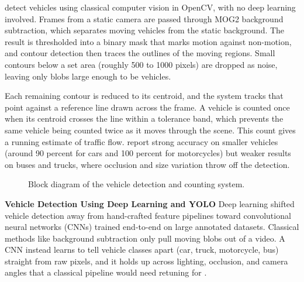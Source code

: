 ﻿\documentclass[11pt, a4paper]{report}
\begin{document}
\cite{dos2024vehicular} detect vehicles using classical computer vision in OpenCV, with no deep learning involved. Frames from a static camera are passed through MOG2 background subtraction, which separates moving vehicles from the static background. The result is thresholded into a binary mask that marks motion against non-motion, and contour detection then traces the outlines of the moving regions. Small contours below a set area (roughly 500 to 1000 pixels) are dropped as noise, leaving only blobs large enough to be vehicles.

Each remaining contour is reduced to its centroid, and the system tracks that point against a reference line drawn across the frame. A vehicle is counted once when its centroid crosses the line within a tolerance band, which prevents the same vehicle being counted twice as it moves through the scene. This count gives a running estimate of traffic flow. \cite{dos2024vehicular} report strong accuracy on smaller vehicles (around 90 percent for cars and 100 percent for motorcycles) but weaker results on buses and trucks, where occlusion and size variation throw off the detection.

\begin{figure}[H]
\begin{center}
\end{center}
\caption{Block diagram of the vehicle detection and counting system.}
\label{fig:vehicle_detection_camera}
\end{figure}

\textbf{Vehicle Detection Using Deep Learning and YOLO}
Deep learning shifted vehicle detection away from hand-crafted feature pipelines toward convolutional neural networks (CNNs) trained end-to-end on large annotated datasets. Classical methods like background subtraction only pull moving blobs out of a video. A CNN instead learns to tell vehicle classes apart (car, truck, motorcycle, bus) straight from raw pixels, and it holds up across lighting, occlusion, and camera angles that a classical pipeline would need retuning for \cite{futuretransp5040137}.
\end{document}
